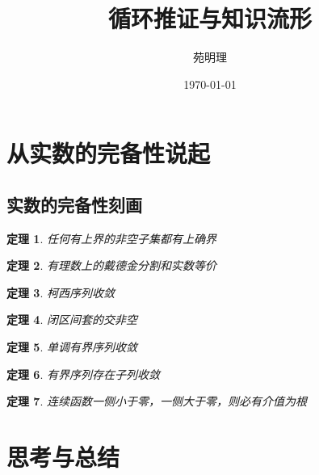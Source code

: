 \documentclass[a4paper,12pt]{article}
\title{循环推证与知识流形}
\author{苑明理}
\date{\monthyeardate\today}
\newtheorem{theorem}{定理}
\begin{document}
\begingroup
\let\newpage\relax
\maketitle
\endgroup

\renewcommand\contentsname{目录}
\setcounter{tocdepth}{2}
\tableofcontents

\newpage

\section{从实数的完备性说起}

\subsection{实数的完备性刻画}

\begin{theorem}
  任何有上界的非空子集都有上确界
\end{theorem}

\begin{theorem}
  有理数上的戴德金分割和实数等价
\end{theorem}

\begin{theorem}
  柯西序列收敛
\end{theorem}

\begin{theorem}
  闭区间套的交非空
\end{theorem}

\begin{theorem}
  单调有界序列收敛
\end{theorem}

\begin{theorem}
  有界序列存在子列收敛
\end{theorem}

\begin{theorem}
  连续函数一侧小于零，一侧大于零，则必有介值为根
\end{theorem}

\section{思考与总结}
\end{document}
